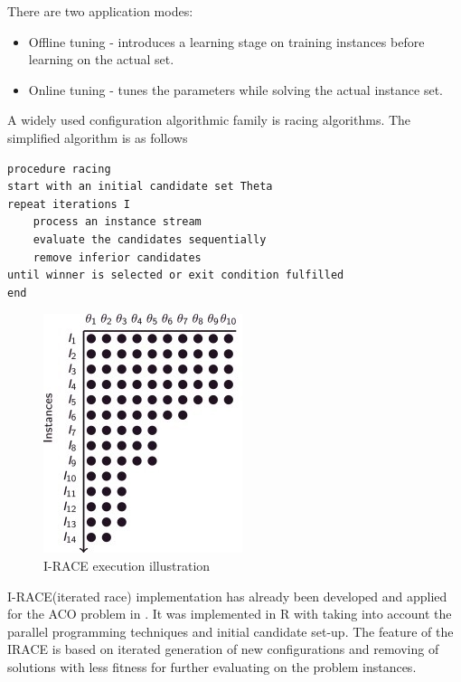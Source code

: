 \documentclass[12pt]{article}
\begin{document}
There are two application modes:
\begin{itemize}
\item Offline tuning - introduces a learning stage on training instances before learning on the actual set.
\item Online tuning - tunes the parameters while solving the actual instance set.
\end{itemize}

A widely used configuration algorithmic family is racing algorithms. The simplified algorithm is as follows


\begin{minipage}[c, breaklines=true]{0.95\textwidth}
\begin{lstlisting}[caption=General racing pseudo-code]
procedure racing
start with an initial candidate set Theta
repeat iterations I
	process an instance stream
	evaluate the candidates sequentially
	remove inferior candidates
until winner is selected or exit condition fulfilled
end
\end{lstlisting}
\end{minipage}




\begin{figure}[H]
  \centering
    \includegraphics[scale=1.2]{irace.jpg}
  \caption{I-RACE execution illustration}
  \label{fig:irace}
\end{figure}


I-RACE(iterated race) implementation has already been developed and applied for the ACO problem in \cite{iraceaac}. It was implemented in R with taking into account the parallel programming techniques and initial candidate set-up. The feature of the IRACE is based on iterated generation of new configurations and removing of solutions with less fitness for further evaluating on the problem instances.
\end{document}
